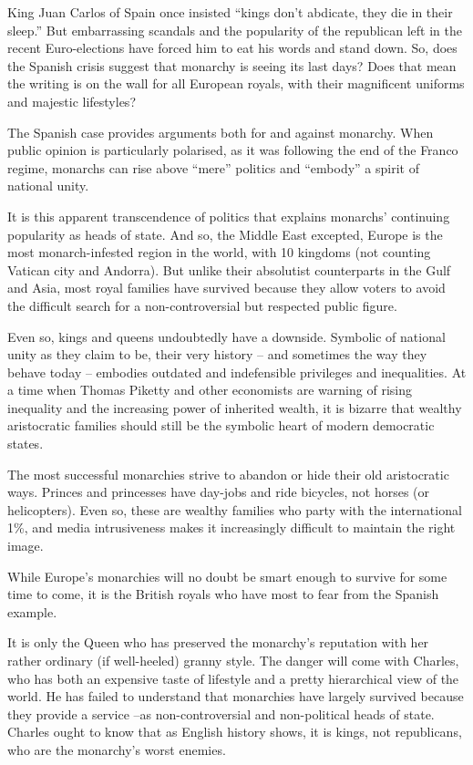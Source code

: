 King Juan Carlos of Spain once insisted ``kings don't abdicate, they die in their sleep.'' But embarrassing scandals and the popularity of the republican left in the recent Euro-elections have forced him to eat his words and stand down. So, does the Spanish crisis suggest that monarchy is seeing its last days? Does that mean the writing is on the wall for all European royals, with their magnificent uniforms and majestic lifestyles?


The Spanish case provides arguments both for and against monarchy. When public opinion is particularly polarised, as it was following the end of the Franco regime, monarchs can rise above ``mere'' politics and ``embody'' a spirit of national unity.


It is this apparent transcendence of politics that explains monarchs' continuing popularity as heads of state. And so, the Middle East excepted, Europe is the most monarch-infested region in the world, with 10 kingdoms (not counting Vatican city and Andorra). But unlike their absolutist counterparts in the Gulf and Asia, most royal families have survived because they allow voters to avoid the difficult search for a non-controversial but respected public figure.


Even so, kings and queens undoubtedly have a downside. Symbolic of national unity as they claim to be, their very history – and sometimes the way they behave today – embodies outdated and indefensible privileges and inequalities. At a time when Thomas Piketty and other economists are warning of rising inequality and the increasing power of inherited wealth, it is bizarre that wealthy aristocratic families should still be the symbolic heart of modern democratic states.


The most successful monarchies strive to abandon or hide their old aristocratic ways. Princes and princesses have day-jobs and ride bicycles, not horses (or helicopters). Even so, these are wealthy families who party with the international 1\%, and media intrusiveness makes it increasingly difficult to maintain the right image.


While Europe's monarchies will no doubt be smart enough to survive for some time to come, it is the British royals who have most to fear from the Spanish example.


It is only the Queen who has preserved the monarchy's reputation with her rather ordinary (if well-heeled) granny style. The danger will come with Charles, who has both an expensive taste of lifestyle and a pretty hierarchical view of the world. He has failed to understand that monarchies have largely survived because they provide a service –as non-controversial and non-political heads of state. Charles ought to know that as English history shows, it is kings, not republicans, who are the monarchy's worst enemies.